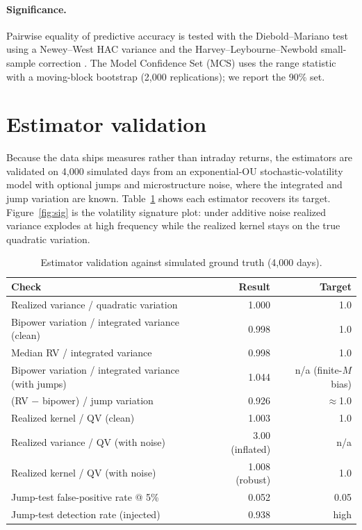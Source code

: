 \documentclass[11pt]{article}
\begin{document}
\paragraph{Significance.} Pairwise equality of predictive accuracy is tested
with the Diebold--Mariano test \cite{dm1995} using a Newey--West HAC variance and the
Harvey--Leybourne--Newbold small-sample correction \cite{hln1997}. The Model Confidence Set
(MCS) \cite{hln2011} uses the range statistic with a moving-block bootstrap (2{,}000
replications); we report the 90\% set.

\section{Estimator validation}
Because the data ships measures rather than intraday returns, the estimators are
validated on 4{,}000 simulated days from an exponential-OU stochastic-volatility
model with optional jumps and microstructure noise, where the integrated and
jump variation are known. Table~\ref{tab:val} shows each estimator recovers its
target. Figure~\ref{fig:sig} is the volatility signature plot: under additive
noise realized variance explodes at high frequency while the realized kernel
stays on the true quadratic variation.

\begin{table}[h]
\centering
\caption{Estimator validation against simulated ground truth (4{,}000 days).}
\label{tab:val}
\begin{tabular}{lrr}
\toprule
Check & Result & Target \\
\midrule
Realized variance / quadratic variation & 1.000 & 1.0 \\
Bipower variation / integrated variance (clean) & 0.998 & 1.0 \\
Median RV / integrated variance & 0.998 & 1.0 \\
Bipower variation / integrated variance (with jumps) & 1.044 & n/a (finite-$M$ bias) \\
(RV $-$ bipower) / jump variation & 0.926 & $\approx$1.0 \\
Realized kernel / QV (clean) & 1.003 & 1.0 \\
Realized variance / QV (with noise) & 3.00 (inflated) & n/a \\
Realized kernel / QV (with noise) & 1.008 (robust) & 1.0 \\
Jump-test false-positive rate @ 5\% & 0.052 & 0.05 \\
Jump-test detection rate (injected) & 0.938 & high \\
\bottomrule
\end{tabular}
\end{table}
\end{document}

